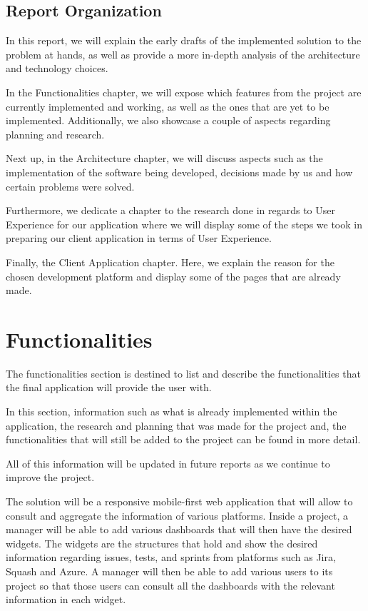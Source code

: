 \documentclass[a4paper,twoside,10pt]{report}
\begin{document}
\section{Report Organization}
In this report, we will explain the early drafts of the implemented solution to the problem at hands, as well as provide a more in-depth analysis of the architecture and technology choices.

In the Functionalities chapter, we will expose which features from the project are currently implemented and working, as well as the ones that are yet to be implemented. Additionally, we also showcase a couple of aspects regarding planning and research.

Next up, in the Architecture chapter, we will discuss aspects such as the implementation of the software being developed, decisions made by us and how certain problems were solved.

Furthermore, we dedicate a chapter to the research done in regards to User Experience for our application where we will display some of the steps we took in preparing our client application in terms of User Experience.

Finally, the Client Application chapter. Here, we explain the reason for the chosen development platform and display some of the pages that are already made.  



\chapter{Functionalities}
The functionalities section is destined to list and describe the functionalities that the final application will provide the user with.

In this section, information such as what is already implemented within the application, the research and planning that was made for the project and, the functionalities that will still be added to the project can be found in more detail.

All of this information will be updated in future reports as we continue to improve the project.


The solution will be a responsive mobile-first web application that will allow to consult and aggregate the information of various platforms. Inside a project, a manager will be able to add various dashboards that will then have the desired widgets. The widgets are the structures that hold and show the desired information regarding issues, tests, and sprints from platforms such as Jira\cite{JIRA}, Squash\cite{SQUASH} and Azure\cite{AZURE}. A manager will then be able to add various users to its project so that those users can consult all the dashboards with the relevant information in each widget.
\end{document}
